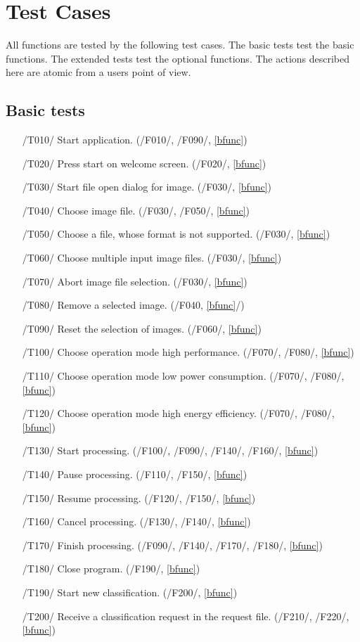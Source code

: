 \documentclass[parskip=full]{scrartcl}
\begin{document}
\pagebreak





\section {Test Cases}

All functions are tested by the following test cases. The basic tests test the basic functions. The extended tests test the optional functions. The actions described here are atomic from a users point of view.

\subsection {Basic tests}

\begin{itemize}
	\item[/T010/] Start application. (/F010/, /F090/, \ref{bfunc})
	\item[/T020/] Press start on welcome screen. (/F020/, \ref{bfunc})
	\item[/T030/] Start file open dialog for image. (/F030/, \ref{bfunc})
	\item[/T040/] Choose image file. (/F030/, /F050/, \ref{bfunc})
	\item[/T050/] Choose a file, whose format is not supported. (/F030/, \ref{bfunc})
	\item[/T060/] Choose multiple input image files. (/F030/, \ref{bfunc})
	\item[/T070/] Abort image file selection. (/F030/, \ref{bfunc})
	\item[/T080/] Remove a selected image. (/F040, \ref{bfunc}/)
	\item[/T090/] Reset the selection of images. (/F060/, \ref{bfunc})
	\item[/T100/] Choose operation mode high performance. (/F070/, /F080/, \ref{bfunc})
	\item[/T110/] Choose operation mode low power consumption. (/F070/, /F080/, \ref{bfunc})
	\item[/T120/] Choose operation mode high energy efficiency. (/F070/, /F080/, \ref{bfunc})
	\item[/T130/] Start processing. (/F100/, /F090/, /F140/, /F160/, \ref{bfunc})
	\item[/T140/] Pause processing. (/F110/, /F150/, \ref{bfunc})
	\item[/T150/] Resume processing. (/F120/, /F150/, \ref{bfunc})
	\item[/T160/] Cancel processing. (/F130/, /F140/, \ref{bfunc})
	\item[/T170/] Finish processing. (/F090/, /F140/, /F170/, /F180/, \ref{bfunc})
	\item[/T180/] Close program. (/F190/, \ref{bfunc})
	\item[/T190/] Start new classification. (/F200/, \ref{bfunc})
	\item[/T200/] Receive a classification request in the request file. (/F210/, /F220/, \ref{bfunc})
\end{itemize}
\end{document}
